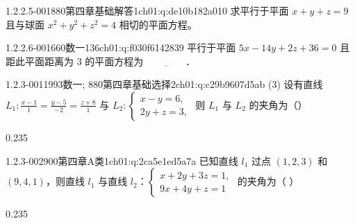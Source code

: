 \par\addvspace{2.4ex}\noindent
\begin{minipage}{\linewidth}

\begin{q}{1.2.2.5-001}{880第四章基础解答1}{ch01:q:de10b182a010}
求平行于平面 $x+y+z=9$ 且与球面 $x^2+y^2+z^2=4$ 相切的平面方程。
\end{q}
\end{minipage}


\par\addvspace{2.4ex}\noindent
\begin{minipage}{\linewidth}

\begin{q}{1.2.2.6-001}{660数一136}{ch01:q:f030f6142839}
平行于平面 $5x-14y+2z+36=0$ 且距此平面距离为 $3$ 的平面方程为 $\underline{\hspace{4em}}$．
\end{q}
\end{minipage}


\par\addvspace{2.4ex}\noindent
\begin{minipage}{\linewidth}

\begin{q}{1.2.3-001}{1993数一; 880第四章基础选择2}{ch01:q:c29b9607d5ab}
(3) 设有直线 $L_1:\frac{x-1}{1}=\frac{y-5}{-2}=\frac{z+8}{1}$ 与 $L_2:\begin{cases} x-y=6,\\ 2y+z=3, \end{cases}$ 则 $L_1$ 与 $L_2$ 的夹角为（\quad）
\begin{opts}{0.235}
\hfill{}\hfill{}\hfill{}
\end{opts}
\end{q}
\end{minipage}


\begin{q}{1.2.3-002}{900第四章A类1}{ch01:q:2ca5e1ed5a7a}
已知直线 $l_1$ 过点 $(1,2,3)$ 和 $(9,4,1)$，则直线 $l_1$ 与直线 $l_2$：$\begin{cases} x+2y+3z=1,\\ 9x+4y+z=1 \end{cases}$ 的夹角为（  ）
\begin{opts}{0.235}
\hfill{}\hfill{}\hfill{}
\end{opts}
\end{q}

